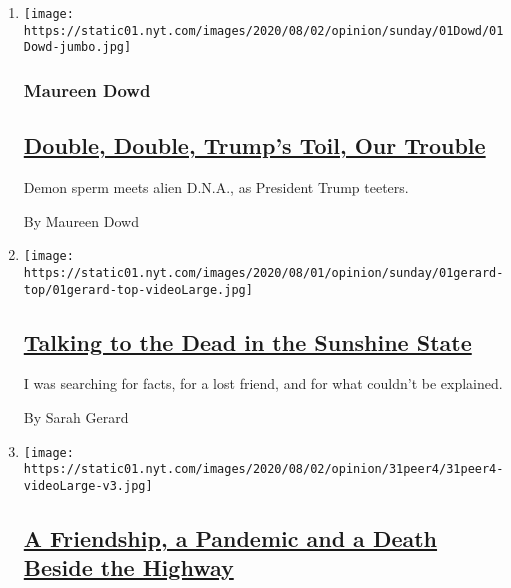 \begin{enumerate}
\def\labelenumi{\arabic{enumi}.}
\item
  \texttt{[image: https://static01.nyt.com/images/2020/08/02/opinion/sunday/01Dowd/01Dowd-jumbo.jpg]}

  \hypertarget{maureen-dowd}{%
  \subsubsection{Maureen Dowd}\label{maureen-dowd}}

  \hypertarget{double-double-trumps-toil-our-trouble}{%
  \subsection{\texorpdfstring{\href{/2020/08/01/opinion/sunday/trump-coronavirus-herman-cain.html}{Double,
  Double, Trump's Toil, Our
  Trouble}}{Double, Double, Trump's Toil, Our Trouble}}\label{double-double-trumps-toil-our-trouble}}

  Demon sperm meets alien D.N.A., as President Trump teeters.

  By Maureen Dowd
\item
  \texttt{[image: https://static01.nyt.com/images/2020/08/01/opinion/sunday/01gerard-top/01gerard-top-videoLarge.jpg]}

  \hypertarget{talking-to-the-dead-in-the-sunshine-state}{%
  \subsection{\texorpdfstring{\href{/2020/08/01/opinion/spiritualism-cassadaga-florida.html}{Talking
  to the Dead in the Sunshine
  State}}{Talking to the Dead in the Sunshine State}}\label{talking-to-the-dead-in-the-sunshine-state}}

  I was searching for facts, for a lost friend, and for what couldn't be
  explained.

  By Sarah Gerard
\item
  \texttt{[image: https://static01.nyt.com/images/2020/08/02/opinion/31peer4/31peer4-videoLarge-v3.jpg]}

  \hypertarget{a-friendship-a-pandemic-and-a-death-beside-the-highway}{%
  \subsection{\texorpdfstring{\href{/2020/07/31/opinion/sunday/India-migration-coronavirus.html}{A
  Friendship, a Pandemic and a Death Beside the
  Highway}}{A Friendship, a Pandemic and a Death Beside the Highway}}\label{a-friendship-a-pandemic-and-a-death-beside-the-highway}}


\end{enumerate}
